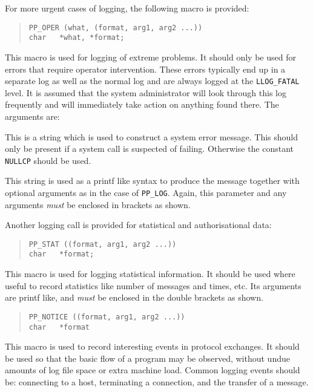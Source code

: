 For more urgent cases of logging, the following macro is provided:

\begin{quote}\begin{verbatim}
PP_OPER (what, (format, arg1, arg2 ...))
char   *what, *format;
\end{verbatim}\end{quote}

This macro is used for logging of extreme problems. It should only be
used for errors that require operator intervention. These errors
typically end up in a separate log as well as the normal log and are
always logged at the \verb|LLOG_FATAL| level. It is assumed that the
system administrator will look through this log frequently and will
immediately take action on anything found there. The arguments are:
\begin{describe}
\item[\verb|what|:]	This is a string which is used to construct a
system error message. This should only be present if a system call is
suspected of failing. Otherwise the constant \verb|NULLCP| should be used.

\item[\verb|format|:]	This string is used as a printf like syntax
to produce the message together with optional arguments as in the case
of \verb|PP_LOG|. Again, this parameter and any arguments {\em must}
be enclosed in brackets as shown.
\end{describe}

Another logging call is provided for statistical and authorisational
data:

\begin{quote}\begin{verbatim}
PP_STAT ((format, arg1, arg2 ...))
char   *format;
\end{verbatim}\end{quote}
This macro is used for logging statistical information. It should be
used where useful to record statistics like number of messages and
times, etc. Its arguments are printf like, and {\em must} be enclosed
in the double brackets as shown.

\begin{quote}\begin{verbatim}
PP_NOTICE ((format, arg1, arg2 ...))
char   *format
\end{verbatim}\end{quote}
This macro is used to record interesting events in protocol exchanges.
It should be used so that the basic flow of a program may be observed,
without undue amounts of log file space or extra machine load. Common
logging events should be: connecting to a host, terminating a
connection, and the transfer of a message.

